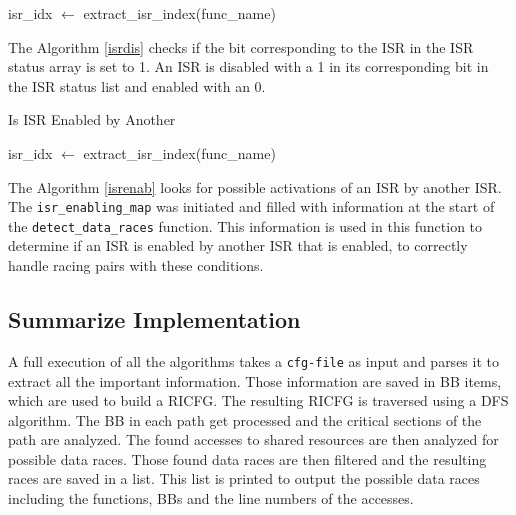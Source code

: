 \documentclass[
fancyheadings, %
%
%
]{stsreprt}
\begin{document}
{\begin{algorithm}[H]
	isr\_idx $\gets$ extract\_isr\_index(func\_name)\;
	\;
\end{algorithm}
\vspace{1cm}


The Algorithm \ref{isrdis} checks if the bit corresponding to the \ac{ISR} in the \Ac{ISR} status array is set to 1. An \Ac{ISR} is disabled with a 1 in its corresponding bit in the \ac{ISR} status list and enabled with an 0. 

\begin{algorithm}[H]
	\label{isrenab}
	\caption{Is ISR Enabled by Another}
	\DontPrintSemicolon
	\SetAlgoLined
	\BlankLine
	
	isr\_idx $\gets$ extract\_isr\_index(func\_name)\;
	\;
\end{algorithm}
\vspace{1cm}
The Algorithm \ref{isrenab} looks for possible activations of an \ac{ISR} by another \ac{ISR}. The \texttt{isr\_enabling\_map} was initiated and filled with information at the start of the \texttt{detect\_data\_races} function. This information is used in this function to determine if an \ac{ISR} is enabled by another \ac{ISR} that is enabled, to correctly handle racing pairs with these conditions.

\subsection*{Summarize Implementation}
A full execution of all the algorithms takes a \texttt{cfg-file} as input and parses it to extract all the important information. Those information are saved in \ac{BB} items, which are used to build a \ac{RICFG}. The resulting \ac{RICFG} is traversed using a \ac{DFS} algorithm. The \ac{BB} in each path get processed and the critical sections of the path are analyzed. The found accesses to shared resources are then analyzed for possible data races. Those found data races are then filtered and the resulting races are saved in a list. This list is printed to output the possible data races including the functions, \acp{BB} and the line numbers of the accesses.

}
\end{document}
